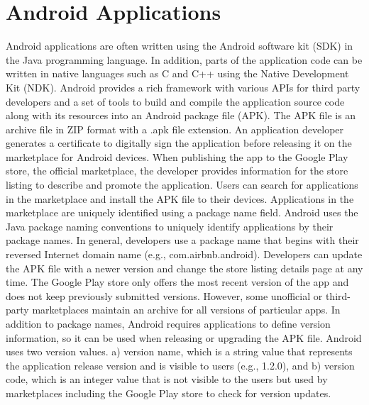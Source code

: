 \section{Android Applications}
Android applications are often written using the Android software kit (SDK) in the Java programming language.
In addition, parts of the application code can be written in native languages such as C and C++ using the Native Development Kit (NDK).
Android provides a rich framework with various APIs for third party developers and a set of tools to build and compile the application source code along with its resources into an Android package file (APK).
The APK file is an archive file in ZIP format with a .apk file extension.
An application developer generates a certificate to digitally sign the application before releasing it on the marketplace for Android devices.
When publishing the app to the Google Play store, the official marketplace, the developer provides information for the store listing to describe and promote the application.
Users can search for applications in the marketplace and install the APK file to their devices.
Applications in the marketplace are uniquely identified using a package name field.
Android uses the Java package naming conventions to uniquely identify applications by their package names.
In general, developers use a package name that begins with their reversed Internet domain name (e.g., com.airbnb.android).
Developers can update the APK file with a newer version and change the store listing details page at any time.
The Google Play store only offers the most recent version of the app and does not keep previously submitted versions.
However, some unofficial or third-party marketplaces maintain an archive for all versions of particular apps.
In addition to package names, Android requires applications to define version information, so it can be used when releasing or upgrading the APK file. Android uses two version values. 
a) version name, which is a string value that represents the application release version and is visible to users (e.g., 1.2.0), and b) version code, which is an integer value that is not visible to the users but used by marketplaces including the Google Play store to check for version updates.

